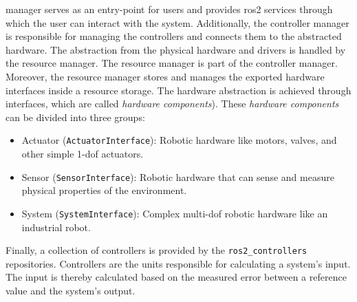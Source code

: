 manager serves as an entry-point for users and provides \gls{ros2} services through which the user can interact with the system. Additionally, the controller manager is responsible for managing the controllers and connects them to the abstracted hardware. The abstraction from the physical hardware and drivers is handled by the resource manager. The resource manager is part of the controller manager. Moreover, the resource manager stores and manages the exported hardware interfaces inside a resource storage. The hardware abstraction is achieved through interfaces, which are called \textit{hardware components}). These \textit{hardware components} can be divided into three groups:
\begin{itemize}
    \item Actuator (\texttt{ActuatorInterface}): Robotic hardware like motors, valves, and other simple 1-\gls{dof} actuators.
    \item Sensor (\texttt{SensorInterface}): Robotic hardware that can sense and measure physical properties of the environment.
    \item System (\texttt{SystemInterface}): Complex multi-\gls{dof} robotic hardware like an industrial robot.
\end{itemize}
 Finally, a collection of controllers is provided by the \texttt{ros2\_controllers} repositories. Controllers are the units responsible for calculating a system's input. The input is thereby calculated based on the measured error between a reference value and the system's output.\newline


